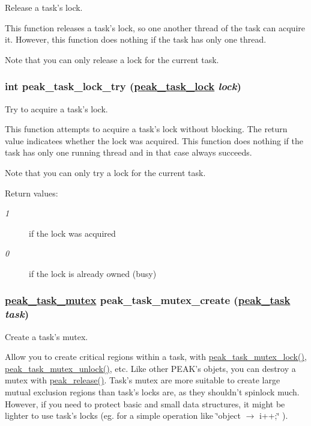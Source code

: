Release a task's lock. 

This function releases a task's lock, so one another thread of the task can acquire it. However, this function does nothing if the task has only one thread.\par
 Note that you can only release a lock for the current task. \hypertarget{group__task__sync_ga5}{
\subsubsection[peak\_\-task\_\-lock\_\-try]{\setlength{\rightskip}{0pt plus 5cm}int peak\_\-task\_\-lock\_\-try (\hyperlink{group__task__sync_ga0}{peak\_\-task\_\-lock} {\em lock})}}
\label{group__task__sync_ga5}


Try to acquire a task's lock. 

This function attempts to acquire a task's lock without blocking. The return value indicatees whether the lock was acquired. This function does nothing if the task has only one running thread and in that case always succeeds.\par
 Note that you can only try a lock for the current task.

\begin{Desc}
\item[Return values:]
\begin{description}
\item[{\em 1}]if the lock was acquired \item[{\em 0}]if the lock is already owned (busy) \end{description}
\end{Desc}
\hypertarget{group__task__sync_ga8}{
\subsubsection[peak\_\-task\_\-mutex\_\-create]{\setlength{\rightskip}{0pt plus 5cm}\hyperlink{group__task__sync_ga1}{peak\_\-task\_\-mutex} peak\_\-task\_\-mutex\_\-create (\hyperlink{group__task__common_ga0}{peak\_\-task} {\em task})}}
\label{group__task__sync_ga8}


Create a task's mutex. 

Allow you to create critical regions within a task, with \hyperlink{group__task__sync_ga9}{peak\_\-task\_\-mutex\_\-lock()}, \hyperlink{group__task__sync_ga11}{peak\_\-task\_\-mutex\_\-unlock()}, etc. Like other PEAK's objets, you can destroy a mutex with \hyperlink{group__alloc_ga7}{peak\_\-release()}. Task's mutex are more suitable to create large mutual exclusion regions than task's locks are, as they shouldn't spinlock much. However, if you need to protect basic and small data structures, it might be lighter to use task's locks (eg. for a simple operation like \char`\"{}object $\rightarrow$ i++;\char`\"{} ).

